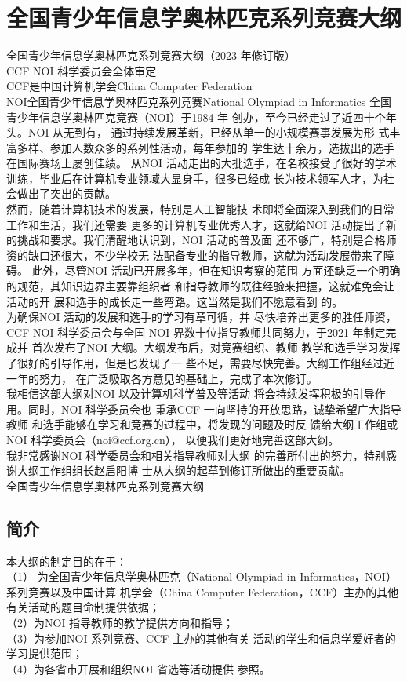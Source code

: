 \documentclass[12pt,twiside,a4paper]{ctexbook}
\numberwithin{chapter}{part}
\begin{document}
\chapter{全国青少年信息学奥林匹克系列竞赛大纲}
全国青少年信息学奥林匹克系列竞赛大纲（2023 年修订版）\\
CCF NOI 科学委员会全体审定\\
CCF是中国计算机学会China Computer Federation\\
NOI全国青少年信息学奥林匹克系列竞赛National Olympiad in Informatics
全国青少年信息学奥林匹克竞赛（NOI）于1984 年
创办，至今已经走过了近四十个年头。NOI 从无到有，
通过持续发展革新，已经从单一的小规模赛事发展为形
式丰富多样、参加人数众多的系列性活动，每年参加的
学生达十余万，选拔出的选手在国际赛场上屡创佳绩。
从NOI 活动走出的大批选手，在名校接受了很好的学术
训练，毕业后在计算机专业领域大显身手，很多已经成
长为技术领军人才，为社会做出了突出的贡献。\\
然而，随着计算机技术的发展，特别是人工智能技
术即将全面深入到我们的日常工作和生活，我们还需要
更多的计算机专业优秀人才，这就给NOI 活动提出了新
的挑战和要求。我们清醒地认识到，NOI 活动的普及面
还不够广，特别是合格师资的缺口还很大，不少学校无
法配备专业的指导教师，这就为活动发展带来了障碍。
此外，尽管NOI 活动已开展多年，但在知识考察的范围
方面还缺乏一个明确的规范，其知识边界主要靠组织者
和指导教师的既往经验来把握，这就难免会让活动的开
展和选手的成长走一些弯路。这当然是我们不愿意看到
的。\\
为确保NOI 活动的发展和选手的学习有章可循，并
尽快培养出更多的胜任师资，CCF NOI 科学委员会与全国
NOI 界数十位指导教师共同努力，于2021 年制定完成并
首次发布了NOI 大纲。大纲发布后，对竞赛组织、教师
教学和选手学习发挥了很好的引导作用，但是也发现了一
些不足，需要尽快完善。大纲工作组经过近一年的努力，
在广泛吸取各方意见的基础上，完成了本次修订。\\
我相信这部大纲对NOI 以及计算机科学普及等活动
将会持续发挥积极的引导作用。同时，NOI 科学委员会也
秉承CCF 一向坚持的开放思路，诚挚希望广大指导教师
和选手能够在学习和竞赛的过程中，将发现的问题及时反
馈给大纲工作组或NOI 科学委员会（noi@ccf.org.cn），
以便我们更好地完善这部大纲。\\
我非常感谢NOI 科学委员会和相关指导教师对大纲
的完善所付出的努力，特别感谢大纲工作组组长赵启阳博
士从大纲的起草到修订所做出的重要贡献。\\
全国青少年信息学奥林匹克系列竞赛大纲\\
\section{简介}
本大纲的制定目的在于：\\
（1） 为全国青少年信息学奥林匹克（National
Olympiad in Informatics，NOI）系列竞赛以及中国计算
机学会（China Computer Federation，CCF）主办的其他
有关活动的题目命制提供依据；\\
（2）为NOI 指导教师的教学提供方向和指导；\\
（3）为参加NOI 系列竞赛、CCF 主办的其他有关
活动的学生和信息学爱好者的学习提供范围；\\
（4）为各省市开展和组织NOI 省选等活动提供
参照。
\end{document}
